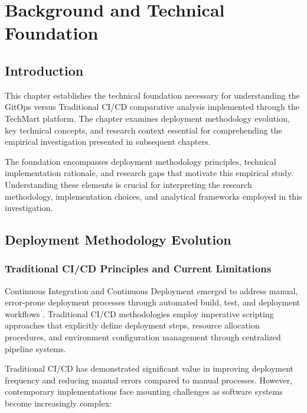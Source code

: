 \chapter{Background and Technical Foundation}

\section{Introduction}

This chapter establishes the technical foundation necessary for understanding the GitOps versus Traditional CI/CD comparative analysis implemented through the TechMart platform. The chapter examines deployment methodology evolution, key technical concepts, and research context essential for comprehending the empirical investigation presented in subsequent chapters.

The foundation encompasses deployment methodology principles, technical implementation rationale, and research gaps that motivate this empirical study. Understanding these elements is crucial for interpreting the research methodology, implementation choices, and analytical frameworks employed in this investigation.

\section{Deployment Methodology Evolution}

\subsection{Traditional CI/CD Principles and Current Limitations}

Continuous Integration and Continuous Deployment emerged to address manual, error-prone deployment processes through automated build, test, and deployment workflows \cite{fowler2013continuous, kim2016devops}. Traditional CI/CD methodologies employ imperative scripting approaches that explicitly define deployment steps, resource allocation procedures, and environment configuration management through centralized pipeline systems.

Traditional CI/CD has demonstrated significant value in improving deployment frequency and reducing manual errors compared to manual processes. However, contemporary implementations face mounting challenges as software systems become increasingly complex:

